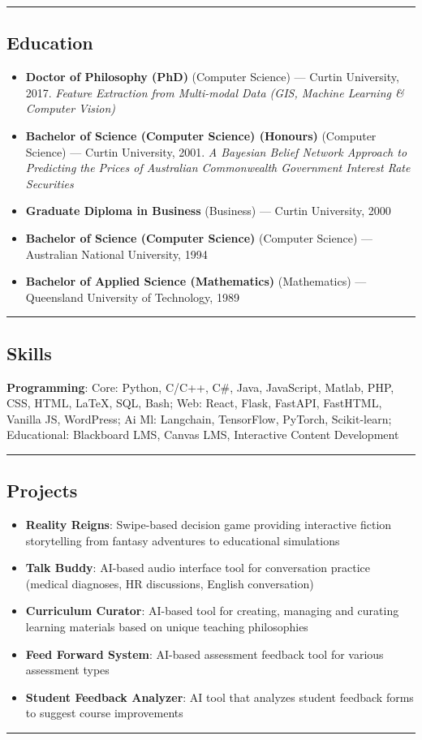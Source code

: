 \documentclass[11pt,a4paper]{article}
\begin{document}
\vspace{4pt}\hrule\vspace{4pt}
\subsection*{Education}
\begin{itemize}
\item \textbf{Doctor of Philosophy (PhD)} (Computer Science) — Curtin University, 2017. \textit{Feature Extraction from Multi-modal Data (GIS, Machine Learning \& Computer Vision)}
\item \textbf{Bachelor of Science (Computer Science) (Honours)} (Computer Science) — Curtin University, 2001. \textit{A Bayesian Belief Network Approach to Predicting the Prices of Australian Commonwealth Government Interest Rate Securities}
\item \textbf{Graduate Diploma in Business} (Business) — Curtin University, 2000
\item \textbf{Bachelor of Science (Computer Science)} (Computer Science) — Australian National University, 1994
\item \textbf{Bachelor of Applied Science (Mathematics)} (Mathematics) — Queensland University of Technology, 1989
\end{itemize}
\vspace{4pt}\hrule\vspace{4pt}
\subsection*{Skills}
\textbf{Programming}: Core: Python, C/C++, C\#, Java, JavaScript, Matlab, PHP, CSS, HTML, LaTeX, SQL, Bash; Web: React, Flask, FastAPI, FastHTML, Vanilla JS, WordPress; Ai Ml: Langchain, TensorFlow, PyTorch, Scikit-learn; Educational: Blackboard LMS, Canvas LMS, Interactive Content Development
\vspace{4pt}\hrule\vspace{4pt}
\subsection*{Projects}
\begin{itemize}
\item \textbf{Reality Reigns}: Swipe-based decision game providing interactive fiction storytelling from fantasy adventures to educational simulations
\item \textbf{Talk Buddy}: AI-based audio interface tool for conversation practice (medical diagnoses, HR discussions, English conversation)
\item \textbf{Curriculum Curator}: AI-based tool for creating, managing and curating learning materials based on unique teaching philosophies
\item \textbf{Feed Forward System}: AI-based assessment feedback tool for various assessment types
\item \textbf{Student Feedback Analyzer}: AI tool that analyzes student feedback forms to suggest course improvements
\end{itemize}
\vspace{4pt}\hrule\vspace{4pt}
\end{document}
